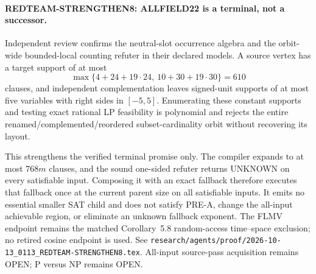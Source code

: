 \paragraph{REDTEAM-STRENGTHEN8: ALLFIELD22 is a terminal, not a successor.}
Independent review confirms the neutral-slot occurrence algebra and the
orbit-wide bounded-local counting refuter in their declared models.  A source
vertex has a target support of at most
\[
 \max\{4+24+19\cdot24,\ 10+30+19\cdot30\}=610
\]
clauses, and independent complementation leaves signed-unit supports of at
most five variables with right sides in $[-5,5]$.  Enumerating these
constant supports and testing exact rational LP feasibility is polynomial
and rejects the entire renamed/complemented/reordered subset-cardinality
orbit without recovering its layout.

This strengthens the verified terminal promise only.  The compiler expands
to at most $768m$ clauses, and the sound one-sided refuter returns UNKNOWN
on every satisfiable input.  Composing it with an exact fallback therefore
executes that fallback once at the current parent size on all satisfiable
inputs.  It emits no essential smaller SAT child and does not satisfy PRE-A,
change the all-input achievable region, or eliminate an unknown fallback
exponent.  The FLMV endpoint remains the matched Corollary~5.8
random-access time--space exclusion; no retired cosine endpoint is used.
See \texttt{research/agents/proof/2026-10-13\_0113\_REDTEAM-STRENGTHEN8.tex}.
All-input source-pass acquisition remains OPEN; P versus NP remains OPEN.
